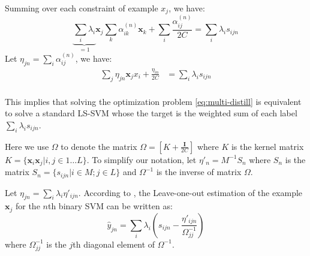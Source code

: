 Summing over each constraint of example $x_j$, we have:
\begin{equation}
\underbrace{\sum_i\lambda_i}_{=1} \textbf{x}_j\sum_{k}\alpha^{(n)}_{ik}\textbf{x}_k+\sum_i\frac{\alpha^{(n)}_{ij}}{2C}=\sum_i\lambda_is_{ijn}
\end{equation}
Let %
$\eta_{jn}=\sum_i\alpha^{(n)}_{ij}$, we have:
\begin{equation}
\begin{aligned}
\sum_j\eta_{jn}\textbf{x}_jx_i+\frac{\eta_{in}}{2C}&=\sum_i\lambda_is_{ijn}\\
\end{aligned}
\end{equation}

This implies that solving the optimization problem \eqref{eq:multi-distill} is equivalent to solve a standard LS-SVM \cite{suykens1999least} whose the target is the weighted sum of each label $\sum_i\lambda_is_{ijn}$.

Here we use $\Omega$ to denote the matrix $\Omega=[K+\frac{\mathbf{I}}{2C}]$ where $K$ is the kernel matrix $K=\{\textbf{x}_i\textbf{x}_j|i,j\in 1\dots L\}$. To simplify our notation, let ${\eta}'_{n}=M^{-1}S_n$ where $S_n$ is the matrix $S_n=\{s_{ijn}|i\in M;j\in L\}$ and $\Omega^{-1}$ is the inverse of matrix $\Omega$. 

Let $\eta_{jn}=\sum_i\lambda_i{\eta}'_{ijn}$.
According to  \cite{cawley2006leave}, the Leave-one-out estimation of the example $\textbf{x}_j$ for the $n$th binary SVM can be written as:
\begin{equation}\label{eq:yhat}
\hat{y}_{jn} = \sum_i\lambda_i\left(s_{ijn}-\frac{{\eta}'_{ijn}}{\Omega_{jj}^{-1}}\right)
\end{equation}
where $\Omega^{-1}_{jj}$ is the $j$th diagonal element of $\Omega^{-1}$.

